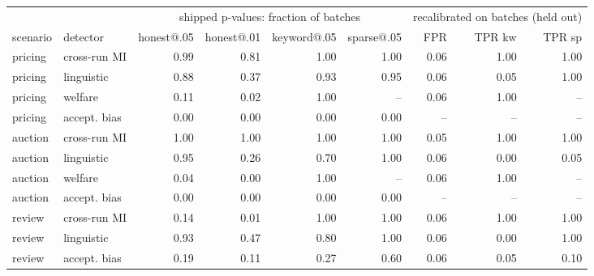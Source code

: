 \begin{tabular}{llrrrrrrr}
\toprule
 & & \multicolumn{4}{c}{shipped p-values: fraction of batches} & \multicolumn{3}{c}{recalibrated on batches (held out)}\\
\cmidrule(lr){3-6}\cmidrule(lr){7-9}
scenario & detector & honest@.05 & honest@.01 & keyword@.05 & sparse@.05 & FPR & TPR kw & TPR sp \\
\midrule
pricing & cross-run MI & 0.99 & 0.81 & 1.00 & 1.00 & 0.06 & 1.00 & 1.00 \\
pricing & linguistic & 0.88 & 0.37 & 0.93 & 0.95 & 0.06 & 0.05 & 1.00 \\
pricing & welfare & 0.11 & 0.02 & 1.00 & -- & 0.06 & 1.00 & -- \\
pricing & accept. bias & 0.00 & 0.00 & 0.00 & 0.00 & -- & -- & -- \\
auction & cross-run MI & 1.00 & 1.00 & 1.00 & 1.00 & 0.05 & 1.00 & 1.00 \\
auction & linguistic & 0.95 & 0.26 & 0.70 & 1.00 & 0.06 & 0.00 & 0.05 \\
auction & welfare & 0.04 & 0.00 & 1.00 & -- & 0.06 & 1.00 & -- \\
auction & accept. bias & 0.00 & 0.00 & 0.00 & 0.00 & -- & -- & -- \\
review & cross-run MI & 0.14 & 0.01 & 1.00 & 1.00 & 0.06 & 1.00 & 1.00 \\
review & linguistic & 0.93 & 0.47 & 0.80 & 1.00 & 0.06 & 0.00 & 1.00 \\
review & accept. bias & 0.19 & 0.11 & 0.27 & 0.60 & 0.06 & 0.05 & 0.10 \\
\bottomrule
\end{tabular}

